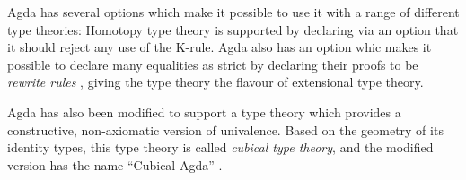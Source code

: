 Agda has several options which make it possible to use it with a range of different
type theories:
Homotopy type theory is supported by declaring via an option 
that it should reject any use of the K-rule.
Agda also has an option  whic makes it possible to declare
many equalities as strict by declaring their proofs to be \emph{rewrite rules}
\citep{cockxrewrite}, giving the type theory the flavour of extensional type
theory.

Agda has also been modified to support a type theory which provides
a constructive, non-axiomatic version of univalence.
Based on the geometry of its identity types, this type theory is called
\emph{cubical type theory}, and the modified version has the name
``Cubical Agda'' \citep{andrea:cubicalagda}.

% 








